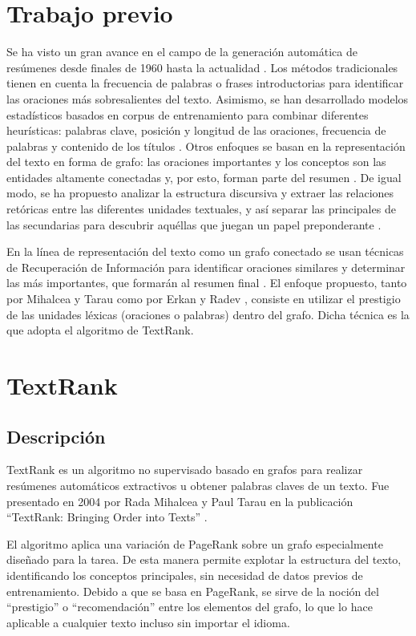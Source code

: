 \documentclass{llncs}
\begin{document}
\section{Trabajo previo}
Se ha visto un gran avance en el campo de la generación automática de resúmenes desde finales de 1960 hasta la actualidad \cite{miranda}. Los métodos tradicionales tienen en cuenta la frecuencia de palabras o frases introductorias para identificar las oraciones más sobresalientes del texto. Asimismo, se han desarrollado modelos estadísticos basados en corpus de entrenamiento para combinar diferentes heurísticas: palabras clave, posición y longitud de las oraciones, frecuencia de palabras y contenido de los títulos \cite{hovy}. Otros enfoques se basan en la representación del texto en forma de grafo: las oraciones importantes y los conceptos son las entidades altamente conectadas y, por esto, forman parte del resumen \cite{barzilay}. De igual modo, se ha propuesto analizar la estructura discursiva y extraer las relaciones retóricas entre las diferentes unidades textuales, y así separar las principales de las secundarias para descubrir aquéllas que juegan un papel preponderante \cite{marcu}.

En la línea de representación del texto como un grafo conectado se usan técnicas de Recuperación de Información para identificar oraciones similares y determinar las más importantes, que formarán al resumen final \cite{salton}. El enfoque propuesto, tanto por Mihalcea y Tarau \cite{mihalcea-tarau} como por Erkan y Radev \cite{erkan}, consiste en utilizar el prestigio de las unidades léxicas (oraciones o palabras) dentro del grafo. Dicha técnica es la que adopta el algoritmo de TextRank.


\section{TextRank}

\subsection{Descripción}
TextRank es un algoritmo no supervisado basado en grafos para realizar resúmenes automáticos extractivos u obtener palabras claves de un texto. Fue presentado en 2004 por Rada Mihalcea y Paul Tarau en la publicación “TextRank: Bringing Order into Texts” \cite{mihalcea-tarau}.

El algoritmo aplica una variación de PageRank \cite{pageetal98} sobre un grafo especialmente diseñado para la tarea. De esta manera permite explotar la estructura del texto, identificando los conceptos principales, sin necesidad de datos previos de entrenamiento. Debido a que se basa en PageRank, se sirve de la noción del “prestigio” o “recomendación” entre los elementos del grafo, lo que lo hace aplicable a cualquier texto incluso sin importar el idioma.
\end{document}
